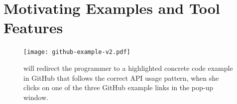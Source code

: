 \section{Motivating Examples and Tool Features}
\label{sec:motivation}
%

\begin{figure}
\centering
\texttt{[image: github-example-v2.pdf]}
  \vspace{.1in}
  \caption{{\tool} will redirect the programmer to a highlighted concrete code example in GitHub that follows the correct API usage pattern, when she clicks on one of the three GitHub example links in the pop-up window.\protect\footnotemark}
  \label{fig:github}
\end{figure}


